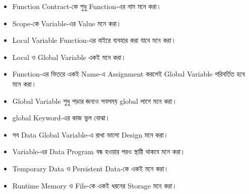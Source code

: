 

\begin{rememberbox}

\begin{itemize}

\item Function Contract-কে শুধু Function-এর নাম মনে করা।

\item Scope-কে Variable-এর Value মনে করা।

\item Local Variable Function-এর বাইরে ব্যবহার করা যাবে মনে করা।

\item Local ও Global Variable একই মনে করা।

\item Function-এর ভিতরে একই Name-এ Assignment করলেই Global Variable
পরিবর্তিত হবে মনে করা।

\item Global Variable শুধু পড়ার জন্যও সবসময়
\textenglish{\ttfamily global}
লাগে মনে করা।

\item
\textenglish{\ttfamily global}
Keyword-এর কাজ ভুল বোঝা।

\item সব Data Global Variable-এ রাখা ভালো Design মনে করা।

\item Variable-এর Data Program বন্ধ হওয়ার পরও স্থায়ী থাকবে মনে করা।

\item Temporary Data ও Persistent Data-কে একই মনে করা।

\item Runtime Memory ও File-কে একই ধরনের Storage মনে করা।

\end{itemize}

\end{rememberbox}


